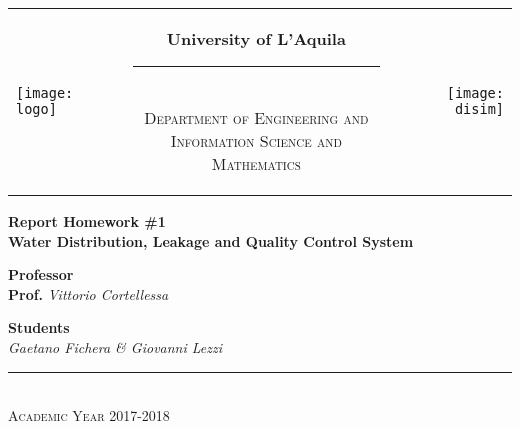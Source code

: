 \begin{titlepage}
\begin{center}
\normalsize

\begin{center}

\begin{tabular}[t]{@{} l @{} c @{} r @{}}
\parbox[c]{0.15\textwidth}{\raggedright \texttt{[image: logo]}}
&
\parbox[c]{0.7\textwidth}
{
\centering \bfseries
University of L'Aquila \\[-5pt]
\rule{0.6\textwidth}{1pt} \\
{\centering \scshape \small Department of Engineering and \\Information Science and Mathematics} \\}
&
\parbox[c]{0.15\textwidth}{\raggedleft \texttt{[image: disim]}}
\end{tabular}
\end{center}

\bigskip \bigskip



\bigskip
\bigskip

\vfil

{\bfseries \Large
Report Homework \#1 \\}
\bigskip
{\bfseries \Large
Water Distribution, Leakage and Quality Control System
}

{\large
\bigskip
\bigskip
\bigskip
\bigskip
{\bfseries \large Professor \\ }
\bigskip
\textbf{Prof.} \textit{Vittorio Cortellessa} \\
}

{\large
\bigskip
\bigskip
\bigskip
\bigskip
{\bfseries \large Students \\ }
\bigskip
\textit{Gaetano Fichera \& Giovanni Lezzi} \\
}

\vfil
\vfil

\vspace{2\baselineskip}


\vfil \vfil \vfil

\rule{\textwidth}{1pt}\\
{\scshape Academic Year 2017-2018}

\end{center}
\end{titlepage}